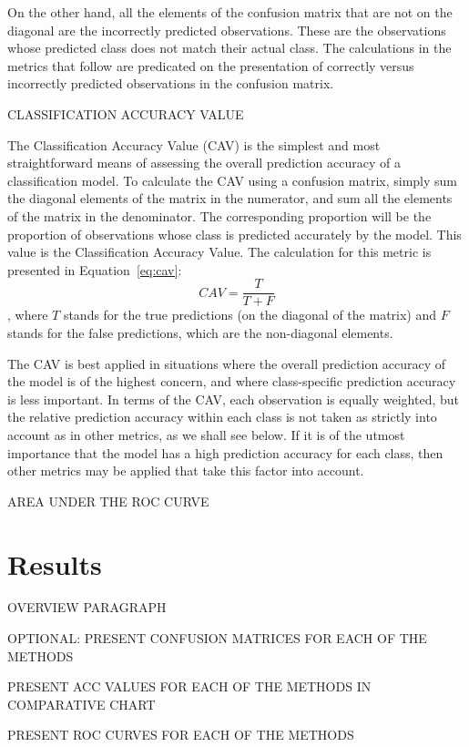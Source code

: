 \documentclass[12pt]{article}
\begin{document}
On the other hand, all the elements of the confusion matrix that are not on the 
diagonal are the incorrectly predicted observations.  These are the observations 
whose predicted class does not match their actual class.  The calculations in 
the metrics that follow are predicated on the presentation of correctly versus 
incorrectly predicted observations in the confusion matrix.  

CLASSIFICATION ACCURACY VALUE

The Classification Accuracy Value (CAV) is the simplest and most straightforward 
means of assessing the overall prediction accuracy of a classification model.  To 
calculate the CAV using a confusion matrix, simply sum the diagonal elements of 
the matrix in the numerator, and sum all the elements of the matrix in the 
denominator.  The corresponding proportion will be the proportion of observations 
whose class is predicted accurately by the model.  This value is the Classification 
Accuracy Value.  The calculation for this metric is presented in 
Equation~\eqref{eq:cav}:
\begin{equation}
    \label{eq:cav}
    CAV = \frac {T} {T + F}
\end{equation}
, where $T$ stands for the true predictions (on the diagonal of the matrix) and $F$ 
stands for the false predictions, which are the non-diagonal elements.  

The CAV is best applied in situations where the overall prediction accuracy of the 
model is of the highest concern, and where class-specific prediction accuracy is less 
important.  In terms of the CAV, each observation is equally weighted, but the 
relative prediction accuracy within each class is not taken as strictly into account 
as in other metrics, as we shall see below.  If it is of the utmost importance that 
the model has a high prediction accuracy for each class, then other metrics may be 
applied that take this factor into account.

AREA UNDER THE ROC CURVE

\section{Results}
\label{sec:resu}

OVERVIEW PARAGRAPH

OPTIONAL: PRESENT CONFUSION MATRICES FOR EACH OF THE METHODS

PRESENT ACC VALUES FOR EACH OF THE METHODS IN COMPARATIVE CHART

PRESENT ROC CURVES FOR EACH OF THE METHODS
\end{document}
